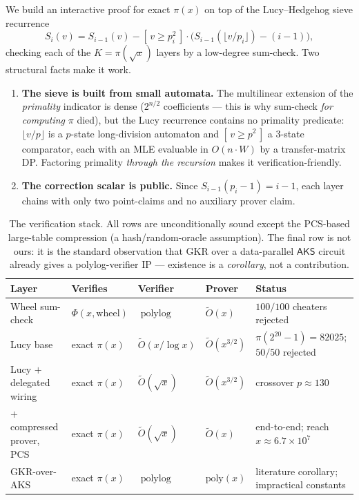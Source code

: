 \documentclass[11pt]{article}
\theoremstyle{plain}
\theoremstyle{definition}
\theoremstyle{remark}
\DeclareMathOperator{\polylog}{polylog}
\newcommand{\Otil}{\widetilde{O}}
\begin{document}
We build an interactive proof for exact $\pi(x)$ on top of the Lucy--Hedgehog
sieve recurrence
\[
  S_i(v) = S_{i-1}(v) - [\,v\ge p_i^2\,]\cdot\big(S_{i-1}(\lfloor v/p_i\rfloor)-(i-1)\big),
\]
checking each of the $K=\pi(\sqrt{x})$ layers by a low-degree sum-check. Two
structural facts make it work.

\begin{enumerate}[leftmargin=1.6em,itemsep=2pt]
\item \textbf{The sieve is built from small automata.} The multilinear extension
of the \emph{primality} indicator is dense ($2^{n/2}$ coefficients --- this is
why sum-check \emph{for computing} $\pi$ died), but the Lucy recurrence contains
no primality predicate: $\lfloor v/p\rfloor$ is a $p$-state long-division
automaton and $[\,v\ge p^2\,]$ a $3$-state comparator, each with an MLE evaluable
in $O(n\cdot W)$ by a transfer-matrix DP. Factoring primality \emph{through the
recursion} makes it verification-friendly.
\item \textbf{The correction scalar is public.} Since $S_{i-1}(p_i-1)=i-1$, each
layer chains with only two point-claims and no auxiliary prover claim.
\end{enumerate}

\begin{table}[t]
\centering
\footnotesize
\begin{tabular}{@{}lllll@{}}
\toprule
\textbf{Layer} & \textbf{Verifies} & \textbf{Verifier} & \textbf{Prover} & \textbf{Status}\\
\midrule
Wheel sum-check & $\Phi(x,\text{wheel})$ & $\polylog$ & $\Otil(x)$ & $100/100$ cheaters rejected \\
Lucy base & exact $\pi(x)$ & $\Otil(x/\log x)$ & $\Otil(x^{3/2})$ & $\pi(2^{20}{-}1){=}82025$; $50/50$ rejected \\
Lucy $+$ delegated wiring & exact $\pi(x)$ & $\Otil(\sqrt{x})$ & $\Otil(x^{3/2})$ & crossover $p{\approx}130$ \\
$+$ compressed prover, PCS & exact $\pi(x)$ & $\Otil(\sqrt{x})$ & $\Otil(x)$ & end-to-end; reach $x{\approx}6.7\times10^7$ \\
GKR-over-AKS & exact $\pi(x)$ & $\polylog$ & $\mathrm{poly}(x)$ & literature corollary; impractical constants \\
\bottomrule
\end{tabular}
\caption{The verification stack. All rows are unconditionally sound except the
PCS-based large-table compression (a hash/random-oracle assumption). The final
row is not ours: it is the standard observation that GKR over a data-parallel
$\mathsf{AKS}$ circuit already gives a polylog-verifier IP --- existence is a
\emph{corollary}, not a contribution.}
\label{tab:stack}
\end{table}
\end{document}
